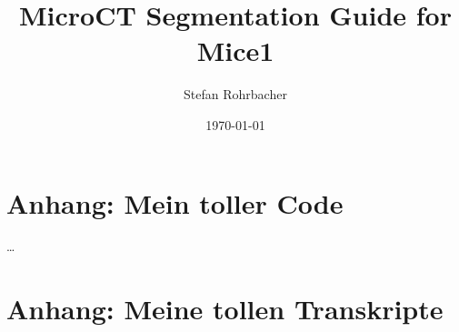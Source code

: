 \documentclass[a4paper]{article}
\title{MicroCT Segmentation Guide for Mice1}
\author{Stefan Rohrbacher}
\date{\today}
\begin{document}


\addtocounter{page}{-1} %

\newpage
\tableofcontents
\newpage
\listoffigures
\newpage
\listoftables
\newpage








\printbibliography
\newpage

\begin{appendix}
	\section{Anhang: Mein toller Code}
	\ldots
	\newpage
	\section{Anhang: Meine tollen Transkripte}
\end{appendix}
\end{document}
